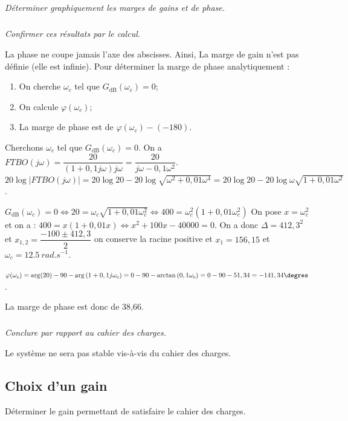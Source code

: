 \documentclass[10pt,fleqn]{article} %
\begin{document}
\begin{multicols}{2}
\subparagraph{}\textit{Déterminer graphiquement les marges de gains et de phase.}
\ifprof
\begin{corrige}
\end{corrige}
\else
\fi

\subparagraph{}\textit{Confirmer ces résultats par le calcul.}
\ifprof
\begin{corrige}
La phase ne coupe jamais l'axe des abscisses. Ainsi, La marge de gain n'est pas définie (elle est infinie).
Pour déterminer la marge de phase analytiquement :
\begin{enumerate}
\item On cherche $\omega_c$ tel que $G_{\text{dB}}(\omega_c)=0$;
\item On calcule $\varphi(\omega_c)$;
\item La marge de phase est de $\varphi(\omega_c) -(-180)$.
\end{enumerate}

Cherchons $\omega_c$ tel que $G_{\text{dB}}(\omega_c)=0$. 
On a $FTBO(j\omega )
=\dfrac{20}{(1+0,1j\omega)j\omega}
=\dfrac{20}{j\omega-0,1\omega^2}$. 
$20\log |FTBO(j\omega )| 
= 20\log 20 - 20\log \sqrt{\omega^2+0,01\omega^4}
= 20\log 20 - 20\log \omega\sqrt{1+0,01\omega^2}$.

 $G_{\text{dB}}(\omega_c)=0 
\Leftrightarrow   20 =\omega_c\sqrt{1+0,01\omega_c^2} 
\Leftrightarrow   400 =\omega_c^2 \left(1+0,01\omega_c^2\right)$
On pose $x=\omega_c^2$ et on a :
$400 =x \left(1+0,01x\right)\Leftrightarrow x^2+100x-40000=0$. 
On a donc $\Delta = 412,3^2$ et $x_{1,2}=\dfrac{-100\pm412,3}{2}$ on conserve la racine positive et  $x_1=156,15$ et $\omega_c=\SI{12,5}{rad.s^{-1}}$.

$\varphi(\omega_c)=\arg(20)-90 -\arg\left(1+0,1j\omega_c \right)
=0- 90 -\arctan\left( 0,1\omega_c \right)
=0-90-51,34=-141,34\degres$.

La marge de phase est donc de 38,66\degres.
\end{corrige}
\else
\fi

\subparagraph{}\textit{Conclure par rapport au cahier des charges.}
\ifprof
\begin{corrige}
Le système ne sera pas stable vis-à-vis du cahier des charges.
\end{corrige}
\else
\fi

\subsection*{Choix d'un gain}

\begin{obj}
Déterminer le gain permettant de satisfaire le cahier des charges.
\end{obj}


\end{multicols}
\end{document}
